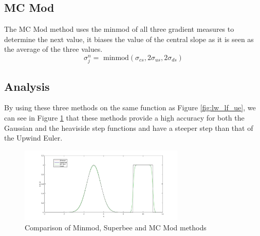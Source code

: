 \subsection{MC Mod}
The MC Mod method uses the minmod of all three gradient measures to determine the next value, it biases the value of the central slope as it is seen as the average of the three values.
\begin{equation*}
  \sigma^n_j = \text{ minmod}(\sigma_{cs},2\sigma_{us},2\sigma_{ds})
\end{equation*}
\subsection{Analysis}
By using these three methods on the same function as Figure \ref{fig:lw_lf_ue}, we can see in Figure \ref{fig:mm_sb_mc} that these methods provide a high accuracy for both the Gaussian and the heaviside step functions and have a steeper step than that of the Upwind Euler.
\begin{figure}[H]
  \centering
  \includegraphics[width=0.7\textwidth]{Images/7_mm_sb_mc.jpg}
  \caption{Comparison of Minmod, Superbee and MC Mod methods}\label{fig:mm_sb_mc}
\end{figure}